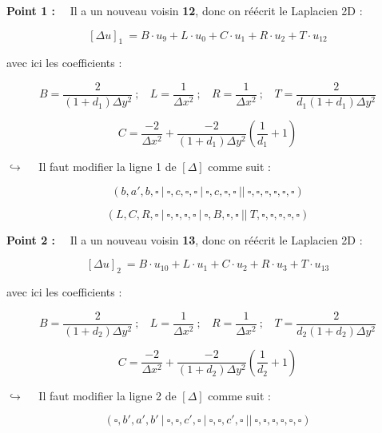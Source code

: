 \documentclass[12pt]{article}
\begin{document}
\vspace{5 mm}

\noindent
\textbf{Point 1 :}~~ Il a un nouveau voisin \textbf{12}, donc on réécrit le Laplacien 2D :

$$[\Delta u]_{1}~ = B \cdot u_{9} + L \cdot u_{0} + C \cdot u_{1} + R \cdot u_{2} + T \cdot u_{12}$$

\vspace{5 mm}
\noindent
avec ici les coefficients :

$$B = \frac{2}{(1+d_1) \Delta y^2}~;~~~~ L = \frac{1}{\Delta x^2}~;~~~~ R = \frac{1}{\Delta x^2} ~;~~~~ T = \frac{2}{d_1(1+d_1) \Delta y^2}$$

$$C = \frac{-2}{\Delta x^2} + \frac{-2}{(1+d_1)\Delta y^2} \left( \frac{1}{d_1} + 1 \right)$$

\vspace{5 mm}

$\hookrightarrow$~~ Il faut modifier la ligne 1 de $[\Delta]$ comme suit :

$$(b,a',b,\square~|~\square,c,\square,\square~|~\square,c,\square,\square~||~\square,\square,\square,\square,\square,\square)$$

$$(L,C,R,\square~|~\square,\square,\square,\square~|~\square,B,\square,\square~||~T,\square,\square,\square,\square,\square)$$

\vspace{5 mm}

\noindent
\textbf{Point 2 :}~~ Il a un nouveau voisin \textbf{13}, donc on réécrit le Laplacien 2D :

\vspace{5 mm}

$$[\Delta u]_{2}~ = B \cdot u_{10} + L \cdot u_{1} + C \cdot u_{2} + R \cdot u_{3} + T \cdot u_{13}$$

\vspace{5 mm}
\noindent
avec ici les coefficients :

$$B = \frac{2}{(1+d_2) \Delta y^2}~;~~~~ L = \frac{1}{\Delta x^2}~;~~~~ R = \frac{1}{\Delta x^2} ~;~~~~ T = \frac{2}{d_2(1+d_2) \Delta y^2}$$

$$C = \frac{-2}{\Delta x^2} + \frac{-2}{(1+d_2)\Delta y^2} \left( \frac{1}{d_2} + 1 \right)$$

\vspace{5 mm}

$\hookrightarrow$~~ Il faut modifier la ligne 2 de $[\Delta]$ comme suit :

$$(\square,b',a',b'~|~\square,\square,c',\square~|~\square,\square,c',\square~||~\square,\square,\square,\square,\square,\square)$$
\end{document}
